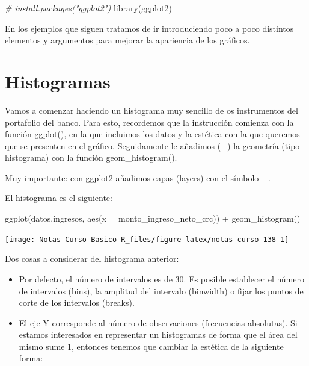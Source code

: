 \documentclass[
  12pt,
]{book}
\newenvironment{Shaded}{\begin{snugshade}}{\end{snugshade}}
\newcommand{\AttributeTok}[1]{\textcolor[rgb]{0.77,0.63,0.00}{#1}}
\newcommand{\CommentTok}[1]{\textcolor[rgb]{0.56,0.35,0.01}{\textit{#1}}}
\newcommand{\FunctionTok}[1]{\textcolor[rgb]{0.00,0.00,0.00}{#1}}
\newcommand{\NormalTok}[1]{#1}
\newcommand{\SpecialCharTok}[1]{\textcolor[rgb]{0.00,0.00,0.00}{#1}}
\providecommand{\tightlist}{%
  \setlength{\itemsep}{0pt}\setlength{\parskip}{0pt}}
\begin{document}
\begin{Shaded}
\begin{Highlighting}[]
\CommentTok{\# install.packages("ggplot2")}
\FunctionTok{library}\NormalTok{(ggplot2)}
\end{Highlighting}
\end{Shaded}

En los ejemplos que siguen tratamos de ir introduciendo poco a poco distintos elementos y argumentos para mejorar la apariencia de los gráficos.

\hypertarget{histogramas}{%
\section{\texorpdfstring{\textbf{Histogramas}}{Histogramas}}\label{histogramas}}

Vamos a comenzar haciendo un histograma muy sencillo de os instrumentos del portafolio del banco. Para esto, recordemos que la instrucción comienza con la función ggplot(), en la que incluimos los datos y la estética con la que queremos que se presenten en el gráfico. Seguidamente le añadimos (+) la geometría (tipo histograma) con la función geom\_histogram().

Muy importante: con ggplot2 añadimos capas (layers) con el símbolo +.

El histograma es el siguiente:

\begin{Shaded}
\begin{Highlighting}[]
\FunctionTok{ggplot}\NormalTok{(datos.ingresos, }\FunctionTok{aes}\NormalTok{(}\AttributeTok{x =}\NormalTok{ monto\_ingreso\_neto\_crc)) }\SpecialCharTok{+}
  \FunctionTok{geom\_histogram}\NormalTok{()}
\end{Highlighting}
\end{Shaded}

\begin{center}\texttt{[image: Notas-Curso-Basico-R\_files/figure-latex/notas-curso-138-1]} \end{center}

Dos cosas a considerar del histograma anterior:

\begin{itemize}
\tightlist
\item
  Por defecto, el número de intervalos es de 30. Es posible establecer el número de intervalos (bins), la amplitud del intervalo (binwidth) o fijar los puntos de corte de los intervalos (breaks).
\item
  El eje Y corresponde al número de observaciones (frecuencias absolutas). Si estamos interesados en representar un histogramas de forma que el área del mismo sume 1, entonces tenemos que cambiar la estética de la siguiente forma:
\end{itemize}
\end{document}
